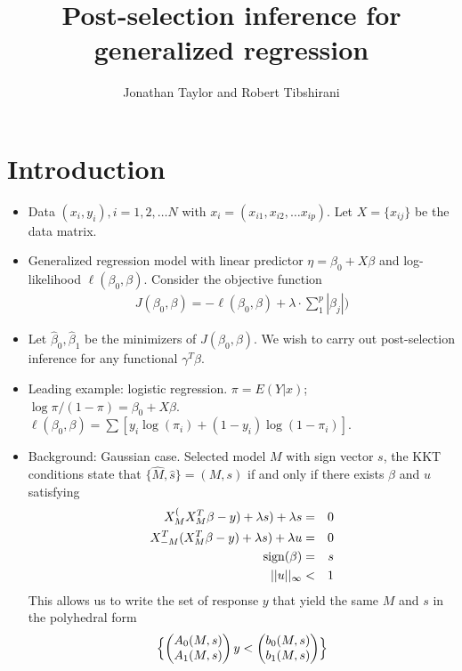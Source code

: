\documentclass{article}
\begin{document}
\title{Post-selection inference for generalized regression}
\author{Jonathan Taylor and  Robert Tibshirani} 

\maketitle

\begin{abstract}
\end{abstract}




\section{Introduction}

\begin{itemize}
\item Data $(x_i, y_i), i=1,2,\ldots N$ with $x_i=(x_{i1},x_{i2},\ldots x_{ip})$.
Let $X= \{x_{ij}\}$ be the data matrix. 


\item Generalized regression model  with linear predictor $\eta=\beta_0+X\beta$ and log-likelihood
$\ell(\beta_0,\beta)$.  Consider the objective function
\begin{eqnarray}
J(\beta_0,\beta)=-\ell(\beta_0,\beta) +\lambda\cdot \sum_1^p |\beta_j|
\label{eqn:obj})
\end{eqnarray}
\item Let $\hat\beta_0, \hat\beta_1$ be the minimizers of $J(\beta_0, \beta)$. We wish to carry out post-selection inference
for any functional  $\gamma^T\beta$.
\item Leading example: logistic regression. $\pi=E(Y|x)$; $\log \pi/(1-\pi)=\beta_0+X\beta$.
$\ell(\beta_0,\beta)=\sum [y_i \log(\pi_i)+(1-y_i)\log(1-\pi_i)]$.

\item Background: Gaussian case. Selected model $M$ with sign vector $s$, 
the  KKT conditions state that $\{\hat M,\hat s \} = (M,s)$ if and only if there exists $\beta$ and $u$ satisfying   
\begin{eqnarray}
X_M^(X_M^T\beta- y) +\lambda s)+\lambda s&=&0 \cr
X_{-M}^T(X_M^T \beta-y)+ \lambda s)+\lambda u&=&0 \cr
{\rm sign}(\beta)&=&s \cr
||u||_\infty &<& 1
\end{eqnarray}
This allows us to write the set of response $y$ that yield the same $M$ and $s$  in the polyhedral form 
\begin{equation}
\Bigl\{   \begin{pmatrix} A_0(M,s) \cr
                         A_1(M,s) 
                 \end{pmatrix}
                  y < 
               \begin{pmatrix} b_0(M,s) \cr
                             b_1(M,s) 
                               \end{pmatrix}
  \Bigr\}
  \end{equation}





\end{itemize}
\end{document}
